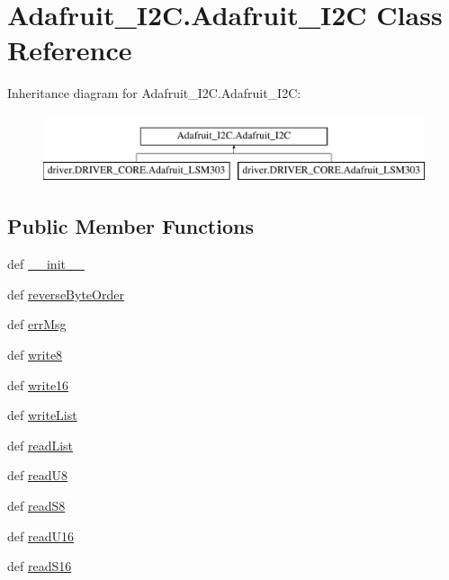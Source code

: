 \hypertarget{classAdafruit__I2C_1_1Adafruit__I2C}{}\section{Adafruit\+\_\+\+I2\+C.\+Adafruit\+\_\+\+I2\+C Class Reference}
\label{classAdafruit__I2C_1_1Adafruit__I2C}
Inheritance diagram for Adafruit\+\_\+\+I2\+C.\+Adafruit\+\_\+\+I2\+C\+:\begin{figure}[H]
\begin{center}
\leavevmode
\includegraphics[height=2.000000cm]{classAdafruit__I2C_1_1Adafruit__I2C}
\end{center}
\end{figure}
\subsection*{Public Member Functions}
\begin{DoxyCompactItemize}
\item 
def \hyperlink{classAdafruit__I2C_1_1Adafruit__I2C_a83af66ea3fce7b0245fdb64878050976}{\+\_\+\+\_\+init\+\_\+\+\_\+}
\item 
def \hyperlink{classAdafruit__I2C_1_1Adafruit__I2C_a5bb7ac499f67c7dd4465852636117788}{reverse\+Byte\+Order}
\item 
def \hyperlink{classAdafruit__I2C_1_1Adafruit__I2C_a8a85bf986064dec23751f8fb3c278774}{err\+Msg}
\item 
def \hyperlink{classAdafruit__I2C_1_1Adafruit__I2C_aed7087725379022f91745e6450e04412}{write8}
\item 
def \hyperlink{classAdafruit__I2C_1_1Adafruit__I2C_ac575a16efe127851dc8992904e42a9a9}{write16}
\item 
def \hyperlink{classAdafruit__I2C_1_1Adafruit__I2C_aae5695cc13e0c52fe4c7c50803d1a0a1}{write\+List}
\item 
def \hyperlink{classAdafruit__I2C_1_1Adafruit__I2C_aaa4af348fd50f0af2aa0399634ef868a}{read\+List}
\item 
def \hyperlink{classAdafruit__I2C_1_1Adafruit__I2C_a2bbafe3a48f5df6f3703043d00de9f72}{read\+U8}
\item 
def \hyperlink{classAdafruit__I2C_1_1Adafruit__I2C_a86809a890063f0e717b6438e455eb0de}{read\+S8}
\item 
def \hyperlink{classAdafruit__I2C_1_1Adafruit__I2C_a05d91a729a66174c990ec90b298978f3}{read\+U16}
\item 
def \hyperlink{classAdafruit__I2C_1_1Adafruit__I2C_a9e699f542684610d24e75d5422e21e03}{read\+S16}
\end{DoxyCompactItemize}
